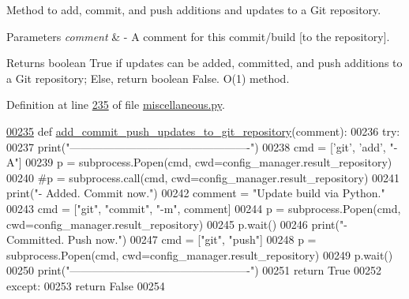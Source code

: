 Method to add, commit, and push additions and updates to a Git repository. 


\begin{DoxyParams}{Parameters}
{\em comment} & -\/ A comment for this commit/build \mbox{[}to the repository\mbox{]}. \\
\hline
\end{DoxyParams}
\begin{DoxyReturn}{Returns}
boolean True if updates can be added, committed, and push additions to a Git repository; Else, return boolean False. O(1) method. 
\end{DoxyReturn}


Definition at line \hyperlink{miscellaneous_8py_source_l00235}{235} of file \hyperlink{miscellaneous_8py_source}{miscellaneous.\+py}.


\begin{DoxyCode}
\hypertarget{classutilities_1_1miscellaneous_1_1misc_l00235}{}\hyperlink{classutilities_1_1miscellaneous_1_1misc_a7837597eba06ec38b69b931ec18e39eb}{00235}     \textcolor{keyword}{def }\hyperlink{classutilities_1_1miscellaneous_1_1misc_a7837597eba06ec38b69b931ec18e39eb}{add\_commit\_push\_updates\_to\_git\_repository}(comment):
00236         \textcolor{keywordflow}{try}:
00237             print(\textcolor{stringliteral}{"-------------------------------------------------"})
00238             cmd = [\textcolor{stringliteral}{'git'}, \textcolor{stringliteral}{'add'}, \textcolor{stringliteral}{"-A"}]
00239             p = subprocess.Popen(cmd, cwd=config\_manager.result\_repository)
00240             \textcolor{comment}{#p = subprocess.call(cmd, cwd=config\_manager.result\_repository)}
00241             print(\textcolor{stringliteral}{"-    Added. Commit now."})
00242             comment = \textcolor{stringliteral}{"Update build via Python."}
00243             cmd = [\textcolor{stringliteral}{"git"}, \textcolor{stringliteral}{"commit"}, \textcolor{stringliteral}{"-m"}, comment]
00244             p = subprocess.Popen(cmd, cwd=config\_manager.result\_repository)
00245             p.wait()
00246             print(\textcolor{stringliteral}{"-    Committed. Push now."})
00247             cmd = [\textcolor{stringliteral}{"git"}, \textcolor{stringliteral}{"push"}]
00248             p = subprocess.Popen(cmd, cwd=config\_manager.result\_repository)
00249             p.wait()
00250             print(\textcolor{stringliteral}{"-------------------------------------------------"})
00251             \textcolor{keywordflow}{return} \textcolor{keyword}{True}
00252         \textcolor{keywordflow}{except}:
00253             \textcolor{keywordflow}{return} \textcolor{keyword}{False}
00254 \end{DoxyCode}
\hypertarget{classutilities_1_1miscellaneous_1_1misc_a9b5ff2b3036d8a1a2e3bacb1d25e2785}{}
